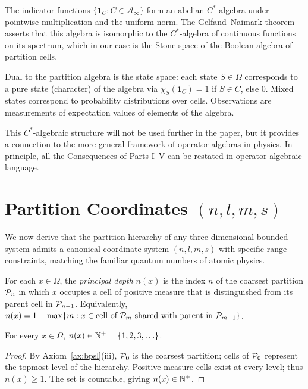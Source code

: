 The indicator functions $\{\mathbf{1}_{C}\colon C\in\mathcal{A}_{\infty}\}$ form an abelian $C^{*}$-algebra under pointwise multiplication and the uniform norm. The Gelfand--Naimark theorem asserts that this algebra is isomorphic to the $C^{*}$-algebra of continuous functions on its spectrum, which in our case is the Stone space of the Boolean algebra of partition cells.

Dual to the partition algebra is the state space: each state $S\in\Omega$ corresponds to a pure state (character) of the algebra via $\chi_{S}(\mathbf{1}_{C})=1$ if $S\in C$, else $0$. Mixed states correspond to probability distributions over cells. Observations are measurements of expectation values of elements of the algebra.

This $C^{*}$-algebraic structure will not be used further in the paper, but it provides a connection to the more general framework of operator algebras in physics. In principle, all the Consequences of Parts I--V can be restated in operator-algebraic language.

\section{Partition Coordinates $(n,l,m,s)$}
\label{sec:quantumnumbers}

We now derive that the partition hierarchy of any three-dimensional bounded system admits a canonical coordinate system $(n,l,m,s)$ with specific range constraints, matching the familiar quantum numbers of atomic physics.

\begin{definition}
\label{def:principal}
For each $x\in\Omega$, the \emph{principal depth} $n(x)$ is the index $n$ of the coarsest partition $\mathcal{P}_{n}$ in which $x$ occupies a cell of positive measure that is distinguished from its parent cell in $\mathcal{P}_{n-1}$. Equivalently, $n(x)=1+\max\{m: x\in\text{cell of }\mathcal{P}_{m}\text{ shared with parent in }\mathcal{P}_{m-1}\}$.
\end{definition}

\begin{lemma}
\label{lem:nispositive}
For every $x\in\Omega$, $n(x)\in\mathbb{N}^{+}=\{1,2,3,\ldots\}$.
\end{lemma}
\begin{proof}
By Axiom~\ref{ax:bpsl}(iii), $\mathcal{P}_{0}$ is the coarsest partition; cells of $\mathcal{P}_{0}$ represent the topmost level of the hierarchy. Positive-measure cells exist at every level; thus $n(x)\ge 1$. The set is countable, giving $n(x)\in\mathbb{N}^{+}$.
\end{proof}

